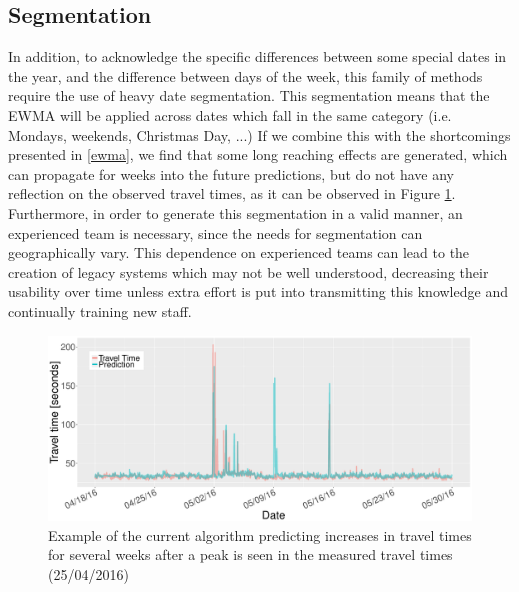 \documentclass[conference]{IEEEtran}
\begin{document}
\subsection{Segmentation}\label{segmentation}
In addition, to acknowledge the specific differences between some special dates in the year, and the difference between days of the week, this family of methods require the use of heavy date segmentation. This segmentation means that the EWMA will be applied across dates which fall in the same category (i.e. Mondays, weekends, Christmas Day, ...)
If we combine this with the shortcomings presented in \ref{ewma}, we find that some long reaching effects are generated, which can propagate for weeks into the future predictions, but do not have any reflection on the observed travel times, as it can be observed in Figure \ref{fig:EWMA_spike}. 
Furthermore, in order to generate this segmentation in a valid manner, an experienced team is necessary, since the needs for segmentation can geographically vary. This dependence on experienced teams can lead to the creation of legacy systems which may not be well understood, decreasing their usability over time unless extra effort is put into transmitting this knowledge and continually training new staff.
\begin{figure}
	\includegraphics[width=\linewidth]{EWMA.pdf}
	\caption{Example of the current algorithm predicting increases in travel times for several weeks after a peak is seen in the measured travel times (25/04/2016)}
	\label{fig:EWMA_spike}
\end{figure}
\end{document}
